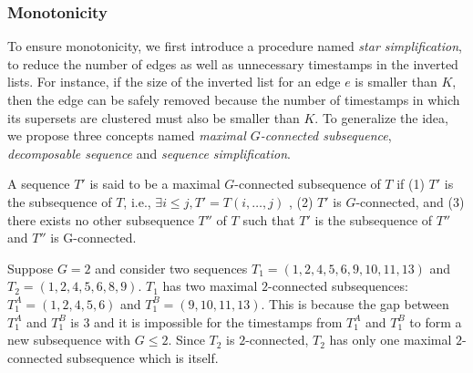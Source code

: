 \subsubsection{Monotonicity}
To ensure monotonicity, we first introduce a procedure named \textit{star simplification}, to reduce the number of edges as well as unnecessary timestamps in the inverted lists. For instance, if the size of the inverted list for an edge $e$ is smaller than $K$, then the edge can be safely removed because the number of timestamps in which its supersets are clustered must also be smaller than $K$. To generalize the idea, we propose three concepts named \textit{maximal $G$-connected subsequence}, \emph{decomposable sequence} and \emph{sequence simplification}.

\begin{definition}
A sequence $T'$ is said to be a maximal $G$-connected subsequence of $T$ if (1) $T'$ is the subsequence of $T$, i.e., $\exists i\leq j, T' = T(i,\ldots,j)$ , (2) $T'$ is $G$-connected, and (3) there exists no other subsequence $T''$ of $T$ such that $T'$ is the subsequence of $T''$ and $T''$ is G-connected.
\end{definition}

\begin{example}
Suppose $G=2$ and consider two sequences $T_1=(1,2,4,5,6,9,10,11,13)$ and $T_2=(1,2,4,5,6,8,9)$. $T_1$ has two maximal $2$-connected subsequences:$T_1^A=(1,2,4,5,6)$ and $T_1^B=(9,10,11,13)$. This is because the gap between $T_1^A$ and $T_1^B$ is $3$ and it is impossible for the timestamps from  $T_1^A$ and $T_1^B$ to form a new subsequence with $G\leq 2$. Since $T_2$ is $2$-connected, $T_2$ has only one maximal $2$-connected subsequence which is
itself. 
\end{example}

